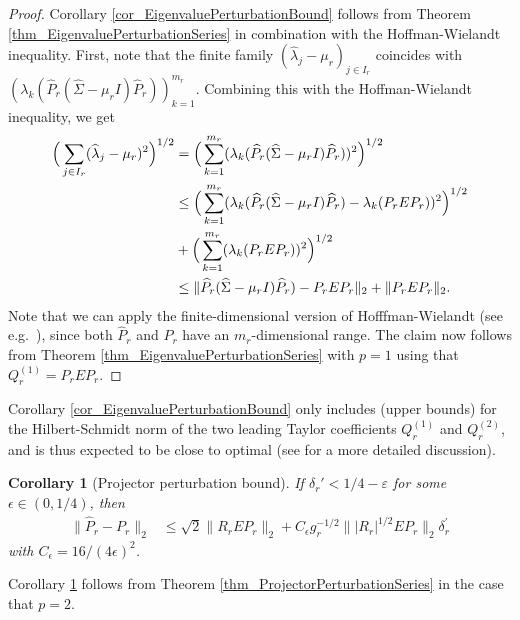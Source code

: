 \documentclass[a4paper,11pt]{article} %
\numberwithin{equation}{section}
\theoremstyle{definition}
\theoremstyle{remark}
\theoremstyle{plain}
\newtheorem{corollary}[definition]{Corollary}
\begin{document}
\begin{proof}%
     Corollary \ref{cor_EigenvaluePerturbationBound} follows from Theorem \ref{thm_EigenvaluePerturbationSeries} in combination with the Hoffman-Wielandt inequality. First, note that the finite family $(\widehat\lambda_j-\mu_r)_{j\in I_r}$ coincides with $(\lambda_k(\widehat P_r(\widehat\Sigma-\mu_{r} I)\widehat P_r))_{k=1}^{m_r}$. 
  Combining this with the Hoffman-Wielandt inequality, we get
  \begin{align}
    \Big( \sum_{j \in I_r} (\widehat{\lambda}_{j} - \mu_{r} )^{2} \Big)^{1/2} 
    &= 
    \Big(\sum_{k = 1}^{m_r} (\lambda_k(\widehat P_r(\widehat\Sigma - \mu_{r} I)\widehat P_r))^2\Big)^{ 1 / 2 }
    \\
    & \le
    \Big( \sum_{k = 1}^{m_r} (\lambda_k(\widehat P_r(\widehat\Sigma-\mu_{r} I)\widehat P_r)-\lambda_k(P_rEP_r))^2\Big)^{ 1 / 2 } \notag \\
    &+\Big(\sum_{k=1}^{m_r}(\lambda_k(P_rEP_r))^2\Big)^{ 1 / 2 }
    \notag 
    \\
    & \le 
    \|\widehat P_r(\widehat\Sigma-\mu_{r} I)\widehat P_r)-P_rEP_r\|_2+\|P_rEP_r\|_2.
    \notag 
  \end{align}
  Note that we can apply the finite-dimensional version of Hofffman-Wielandt (see e.g.~\cite{MR2906465}), since both $\widehat P_r$ and $P_r$ have an $m_r$-dimensional range.
  The claim now follows from Theorem \ref{thm_EigenvaluePerturbationSeries} with $p=1$ using that $ Q_r^{(1)} = P_r E P_r $.
\end{proof}%

Corollary \ref{cor_EigenvaluePerturbationBound} only includes (upper bounds) for the Hilbert-Schmidt norm of the two leading Taylor coefficients $ Q_r^{(1)}$ and $ Q_r^{(2)}$, and is thus expected to be close to optimal (see \cite{Wahl2026PertubationExpansionsI} for a more detailed discussion).

\begin{corollary}[Projector perturbation bound]%
  \label{cor_ProjectorPerturbationBound}
  If \( \delta_r' < 1 / 4 - \varepsilon \) for some $\epsilon\in(0,1/4)$, then
  \begin{align}
    \| \widehat{P}_{r} - P_r\|_{2} 
    & \le 
     \sqrt{2}\|  R_{r} E P_{r} \|_{2}+C_\epsilon g_r^{-1/2}\| | R_{r} |^{1/2} E P_{r} \|_{2}\delta_r^\prime
  \end{align}
  with $C_\epsilon=16/(4\epsilon)^2$.
\end{corollary}%

\noindent Corollary \ref{cor_ProjectorPerturbationBound} follows from Theorem
\ref{thm_ProjectorPerturbationSeries} in the case that $p = 2$.
\end{document}
